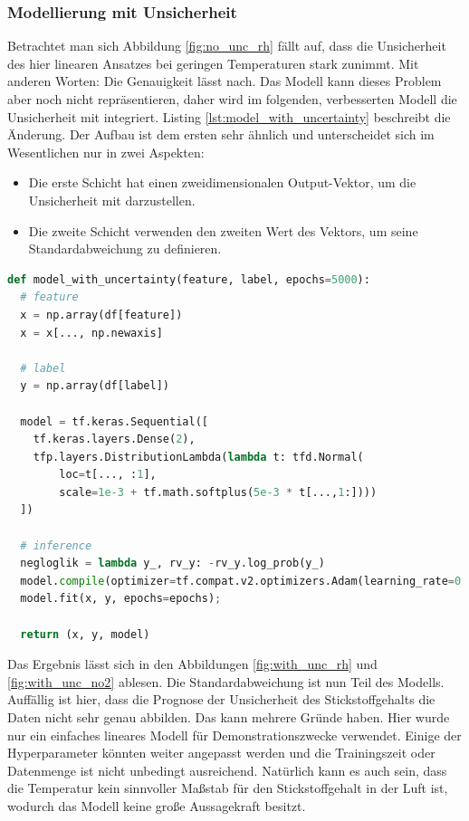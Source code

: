 \documentclass[12pt]{article}
\begin{document}
\subsubsection{Modellierung mit Unsicherheit}
\label{sec:with_unc}

Betrachtet man sich Abbildung \ref{fig:no_unc_rh} fällt auf, dass die Unsicherheit des hier linearen Ansatzes bei geringen Temperaturen stark zunimmt. Mit anderen Worten: Die Genauigkeit lässt nach. Das Modell kann dieses Problem aber noch nicht repräsentieren, daher wird im folgenden, verbesserten Modell die Unsicherheit mit integriert. Listing \ref{lst:model_with_uncertainty} beschreibt die Änderung. Der Aufbau ist dem ersten sehr ähnlich und unterscheidet sich im Wesentlichen nur in zwei Aspekten: 

\begin{itemize}
  \item Die erste Schicht hat einen zweidimensionalen Output-Vektor, um die Unsicherheit mit darzustellen.
  \item Die zweite Schicht verwenden den zweiten Wert des Vektors, um seine Standardabweichung zu definieren. 
\end{itemize}



\begin{lstlisting}[language=Python, caption={Modell mit Keras mit Unsicherheit}, label={lst:model_with_uncertainty}]
def model_with_uncertainty(feature, label, epochs=5000):
  # feature
  x = np.array(df[feature])
  x = x[..., np.newaxis]

  # label
  y = np.array(df[label])
  
  model = tf.keras.Sequential([
    tf.keras.layers.Dense(2),
    tfp.layers.DistributionLambda(lambda t: tfd.Normal(
        loc=t[..., :1],
        scale=1e-3 + tf.math.softplus(5e-3 * t[...,1:])))
  ])

  # inference
  negloglik = lambda y_, rv_y: -rv_y.log_prob(y_)
  model.compile(optimizer=tf.compat.v2.optimizers.Adam(learning_rate=0.01), loss=negloglik)
  model.fit(x, y, epochs=epochs);

  return (x, y, model)
\end{lstlisting}

Das Ergebnis lässt sich in den Abbildungen \ref{fig:with_unc_rh} und \ref{fig:with_unc_no2} ablesen. Die Standardabweichung ist nun Teil des Modells. Auffällig ist hier, dass die Prognose der Unsicherheit des Stickstoffgehalts die Daten nicht sehr genau abbilden. Das kann mehrere Gründe haben. Hier wurde nur ein einfaches lineares Modell für Demonstrationszwecke verwendet. Einige der Hyperparameter könnten weiter angepasst werden und die Trainingszeit oder Datenmenge ist nicht unbedingt ausreichend. Natürlich kann es auch sein, dass die Temperatur kein sinnvoller Maßstab für den Stickstoffgehalt in der Luft ist, wodurch das Modell keine große Aussagekraft besitzt. 
\end{document}
